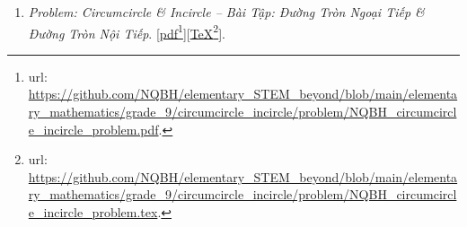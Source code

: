 \documentclass[12pt,oneside]{book}
\begin{document}
\begin{enumerate}
	Folder: {\sf Elementary STEM \& Beyond{\tt/}Elementary Mathematics{\tt/}grade 9{\tt/}2nd-order function, quadratic equation{\tt/}problem}.
	\begin{itemize}
		\item {\it Problem \& Solution: 2nd-Order Function. Quadratic Equation -- Bài Tập \& Lời Giải: Hàm Số Bậc 2 $y = ax^2$. Phương Trình Bậc 2 1 Ẩn $ax^2 + bx + c = 0$}. [\href{https://github.com/NQBH/elementary_STEM_beyond/blob/main/elementary_mathematics/grade_9/2nd_order_function/solution/NQBH_2nd_order_function_solution.pdf}{pdf}\footnote{{\sc url}: \url{https://github.com/NQBH/elementary_STEM_beyond/blob/main/elementary_mathematics/grade_9/2nd_order_function/solution/NQBH_2nd_order_function_solution.pdf}.}][\href{https://github.com/NQBH/elementary_STEM_beyond/blob/main/elementary_mathematics/grade_9/2nd_order_function/solution/NQBH_2nd_order_function_solution.tex}{\TeX}\footnote{{\sc url}: \url{https://github.com/NQBH/elementary_STEM_beyond/blob/main/elementary_mathematics/grade_9/2nd_order_function/solution/NQBH_2nd_order_function_solution.tex}.}].
		
		Folder: {\sf Elementary STEM \& Beyond{\tt/}Elementary Mathematics{\tt/}grade 9{\tt/}2nd-order function, quadratic equation{\tt/}solution}.
	\end{itemize}
	\item {\it Problem: Circumcircle {\it\&} Incircle -- Bài Tập: Đường Tròn Ngoại Tiếp {\it\&} Đường Tròn Nội Tiếp}. [\href{https://github.com/NQBH/elementary_STEM_beyond/blob/main/elementary_mathematics/grade_9/circumcircle_incircle/problem/NQBH_circumcircle_incircle_problem.pdf}{pdf}\footnote{{\sc url}: \url{https://github.com/NQBH/elementary_STEM_beyond/blob/main/elementary_mathematics/grade_9/circumcircle_incircle/problem/NQBH_circumcircle_incircle_problem.pdf}.}][\href{https://github.com/NQBH/elementary_STEM_beyond/blob/main/elementary_mathematics/grade_9/circumcircle_incircle/problem/NQBH_circumcircle_incircle_problem.tex}{\TeX}\footnote{{\sc url}: \url{https://github.com/NQBH/elementary_STEM_beyond/blob/main/elementary_mathematics/grade_9/circumcircle_incircle/problem/NQBH_circumcircle_incircle_problem.tex}.}].
	

\end{enumerate}
\end{document}
